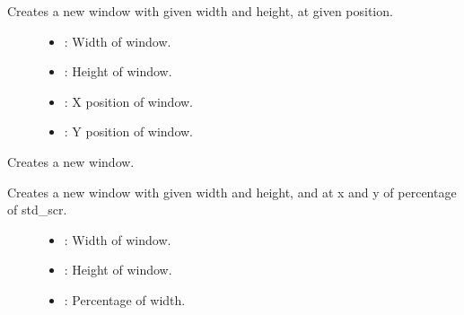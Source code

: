 \documentclass[letterpaper,10pt,english]{sphinxmanual}
\begin{document}
\begin{fulllineitems}
\begin{fulllineitems}
Creates a new window with given width and height, at given position. \begin{description}
\item[{}] \leavevmode\begin{itemize}
\item {} 
: Width of window. 

\item {} 
: Height of window. 

\item {} 
: X position of window. 

\item {} 
: Y position of window. 

\end{itemize}

\end{description}


\end{fulllineitems}


\begin{fulllineitems}
\label{\detokenize{index:_CPPv2N7ostendo6Window6WindowEiidd}}%
\pysigstartmultiline
{}\label{\detokenize{index:Pessumclassostendo_1_1Window_1ab53551696f1078083f23a5d0eeb01ee3}}%
\pysigstopmultiline
Creates a new window. 

Creates a new window with given width and height, and at x and y of percentage of std\_scr. \begin{description}
\item[{}] \leavevmode
{\hyperref[\detokenize{index:Pessumnamespaceostendo_1a4c5850c8a109e159e874ecce8a5dc62a}]{}} 

\item[{}] \leavevmode\begin{itemize}
\item {} 
: Width of window. 

\item {} 
: Height of window. 

\item {} 
: Percentage of width. 


\end{itemize}
\end{description}
\end{fulllineitems}
\end{fulllineitems}
\end{document}
